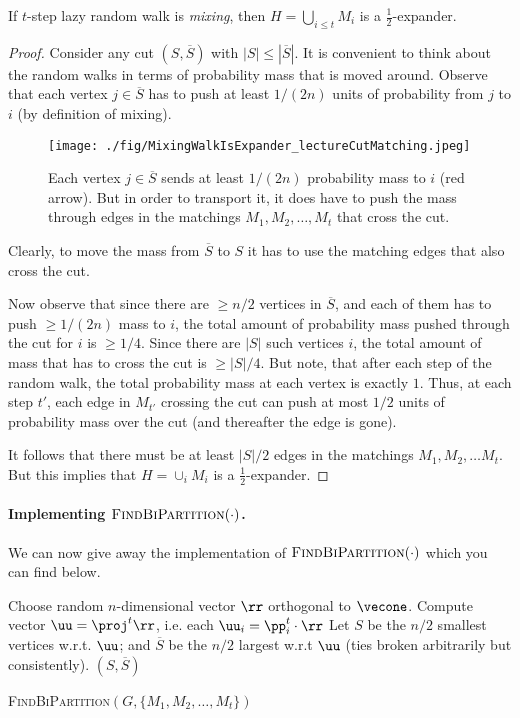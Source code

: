 \begin{lemma}
If $t$-step lazy random walk is \emph{mixing}, then $H = \bigcup_{i \leq t} M_i$ is a $\frac{1}{2}$-expander.
\end{lemma}
\begin{proof}
Consider any cut $(S, \overline{S})$ with $|S| \leq |\overline{S}|$. It is convenient to think about the random walks in terms of probability mass that is moved around. Observe that each vertex $j \in \overline{S}$ has to push at least $1/(2n)$ units of probability from $j$ to $i$ (by definition of mixing). 

\begin{figure}[!ht]
    \centering
    \texttt{[image: ./fig/MixingWalkIsExpander\_lectureCutMatching.jpeg]}
    \caption{Each vertex $j \in \overline{S}$ sends at least $1/(2n)$ probability mass to $i$ (red arrow). But in order to transport it, it does have to push the mass through edges in the matchings $M_1, M_2, \dots, M_t$ that cross the cut.}
    \label{fig:my_label}
\end{figure}

Clearly, to move the mass from $\overline{S}$ to $S$ it has to use the matching edges that also cross the cut.

Now observe that since there are $\geq n/2$ vertices in $\overline{S}$, and each of them has to push $\geq 1/(2n)$ mass to $i$, the total amount of probability mass pushed through the cut for $i$ is $\geq 1/4$. Since there are $|S|$ such vertices $i$, the total amount of mass that has to cross the cut is $\geq |S|/4$. 
But note, that after each step of the random walk, the total probability mass at each vertex is exactly $1$. Thus, at each step $t'$, each edge in $M_{t'}$ crossing the cut can push at most $1/2$ units of probability mass over the cut (and thereafter the edge is gone). 

It follows that there must be at least $|S|/2$ edges in the matchings $M_1, M_2, \dots M_{t}$. But this implies that $H = \cup_i M_i$ is a $\frac{1}{2}$-expander.

\end{proof}

\paragraph{Implementing $\textsc{FindBiPartition}(\cdot)$.} We can now give away the implementation of $\textsc{FindBiPartition}(\cdot)$ which you can find below.

\begin{algorithm}[H]
    Choose random $n$-dimensional vector $\rr$ orthogonal to $\vecone$.\;
    Compute vector $\uu = \proj^t \rr$, i.e. each $\uu_i = \pp_i^t \cdot \rr$\;
    Let $S$ be the $n/2$ smallest vertices w.r.t. $\uu$; and $\overline{S}$ be the $n/2$ largest w.r.t $\uu$ (ties broken arbitrarily but consistently).\;
    \Return $(S, \overline{S})$
  \caption{\textsc{FindBiPartition}$(G, \{M_1, M_2, \dots, M_t\})$}
  \label{algo:findBiPartition}
\end{algorithm}


